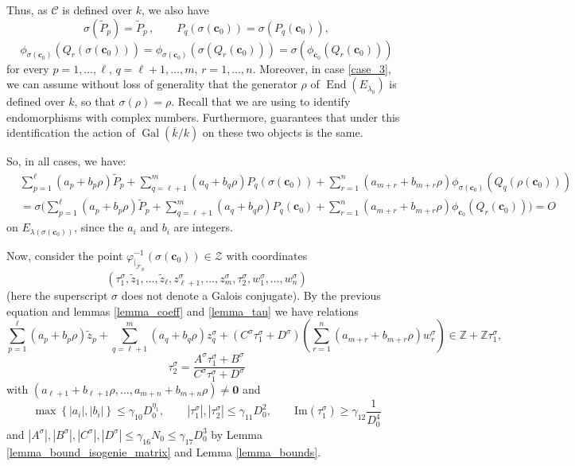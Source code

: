 \documentclass[11pt,a4paper,reqno]{amsart}
\numberwithin{equation}{section}
\newcommand{\Z}{\mathbb{Z}}
\renewcommand{\c}{\mathcal{C}}
\newcommand{\cc}{\mathbf{c}}
\newcommand{\g}{\gamma}
\newcommand{\f}{\varphi}
\renewcommand{\l}{\lambda}
\newcommand{\s}{\sigma}
\renewcommand{\r}{\rho}
\newcommand{\pt}[1]{\left( #1 \right)}
\newcommand{\pg}[1]{\left\lbrace #1 \right\rbrace}
\newcommand{\abs}[1]{\left| #1 \right|}
\renewcommand{\Im}{\mathrm{Im}}
\DeclareMathOperator{\en}{End}
\DeclareMathOperator{\Gal}{Gal}
\theoremstyle{remark}
\theoremstyle{definition}
\theoremstyle{definition}
\begin{document}
Thus, as $\c$ is defined over $k$, we also have
$$\s(\widetilde{P}_p)=\widetilde{P}_p \, , \qquad P_q(\s(\cc_0))=\s\pt{P_q(\cc_0)},$$ 
$$\phi_{\s(\cc_0)}\pt{Q_r(\s(\cc_0))}=\phi_{\s(\cc_0)}\pt{\s\pt{Q_r(\cc_0)}}=\s \pt{\phi_{\cc_0}\pt{Q_r(\cc_0)}}$$
for every $p=1, \ldots, \ell$, $q=\ell+1, \ldots, m$, $r=1, \ldots, n$.
Moreover, in case \ref{case_3}, we can assume without loss of generality that the generator $\r$ of $\en(E_{\l_0})$ is defined over $k$, so that $\s(\r)=\r$. Recall that we are using \cite[Proposition II.1.1]{Sil94} to identify endomorphisms with complex numbers. Furthermore, \cite[Proposition II.2.2]{Sil94} guarantees that under this identification the action of $\Gal(\overline{k}/k)$ on these two objects is the same.

So, in all cases, we have:
\begin{align*}
&\sum\limits_{p=1}^{\ell} (a_p +b_p \r)\widetilde{P}_p +\sum\limits_{q=\ell+1}^{m} (a_q +b_q \r)P_q(\s(\cc_0)) + \sum\limits_{r=1}^{n} (a_{m+r}+b_{m+r}\r) \phi_{\s(\cc_0)}(Q_q(\r(\cc_0)))\\
&=\s\Big(\sum\limits_{p=1}^{\ell} (a_p +b_p \r)\widetilde{P}_p +\sum\limits_{q=\ell+1}^{m} (a_q +b_q \r)P_q(\cc_0) + \sum\limits_{r=1}^{n} (a_{m+r}+b_{m+r}\r) \phi_{\cc_0}(Q_r(\cc_0))\Big)=O
\end{align*}
on $E_{\l(\s(\cc_0))}$, since the $a_i$ and $b_i$ are integers.

Now, consider the point $\f^{-1}_{\vert_{\mathcal{F}_{\mathcal{B}}}}\pt{\s(\cc_0)} \in \mathcal{Z}$ with coordinates $$\pt{\tau_1^{\s},\widetilde{z}_1, \ldots, \widetilde{z}_{\ell}, z_{\ell+1}^{\s},\ldots, z_m^{\s}, \tau_2^{\s}, w_1^{\s}, \ldots, w_n^{\s}}$$
(here the superscript $\s$ does not denote a Galois conjugate). By the previous equation and lemmas \ref{lemma_coeff} and \ref{lemma_tau} we have relations
$$\sum\limits_{p=1}^{\ell} (a_p +b_p \r)\widetilde{z}_p +\sum\limits_{q=\ell+1}^{m} (a_q +b_q \r)z_q^{\s} + (C^{\s}\tau_1^{\s}+D^{\s})\pt{\sum\limits_{r=1}^{n} (a_{m+r}+b_{m+r}\r) w_r^{\s}} \in \Z+\Z\tau_1^{\s},$$
$$\tau_2^{\s}=\dfrac{A^{\s}\tau_1^{\s}+B^{\s}}{C^{\s}\tau_1^{\s}+D^{\s}}$$
with $(a_{\ell+1}+b_{\ell+1} \r, \ldots, a_{m+n}+ b_{m+n}\r)\neq \mathbf{0}$ and
$$\max \pg{\abs{a_i}, \abs{b_i}} \leq \g_{10} D_0^{\eta_1}, \qquad \abs{\tau_1^{\s}},\abs{\tau_2^{\s}}\leq \g_{11} D_0^{2}, \qquad \Im(\tau_1^{\s})\geq \g_{12} \dfrac{1}{D_0^4} $$
and $\abs{A^{\s}},\abs{B^{\s}},\abs{C^{\s}},\abs{D^{\s}}\leq \g_{16}N_0\leq \g_{17} D_0^{3}$ by Lemma \ref{lemma_bound_isogenie_matrix} and Lemma \ref{lemma_bounds}.
\end{document}
